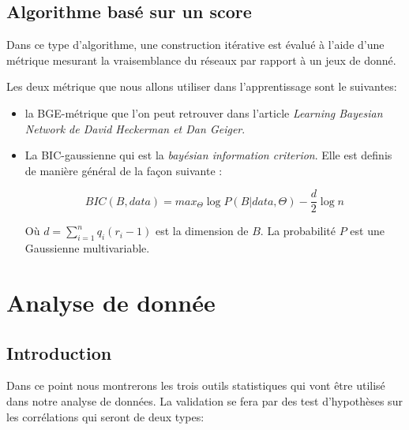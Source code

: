 \documentclass[a4paper]{article}
\begin{document}
\subsection{Algorithme basé sur un score}

Dans ce type d'algorithme, une construction itérative est évalué à l'aide d'une métrique mesurant la vraisemblance du réseaux par rapport à un jeux de donné.

Les deux métrique que nous allons utiliser dans l'apprentissage sont le suivantes:


\begin{itemize}
  \item la BGE-métrique que l'on peut retrouver dans l'article \textit{Learning Bayesian Network de David Heckerman et Dan Geiger}.

  \item La BIC-gaussienne qui est la \textit{bayésian  information criterion}. Elle est definis de manière général de la façon suivante :

$$ BIC(B,data)=max_{\Theta}\log P(B|data,\Theta)-\frac{d}{2}\log{n}$$

Où $d=\sum_{i=1}^{n} q_{i} (r_{i}-1) $ est la dimension de $B$.
La probabilité $P$ est une Gaussienne  multivariable.

\end{itemize}




\newpage

\section{Analyse de donnée}

\subsection{Introduction}
Dans ce point nous montrerons les trois outils statistiques qui vont être utilisé dans  notre analyse de données.
La validation se fera par des  test d'hypothèses sur les corrélations qui seront de deux types:
\end{document}

